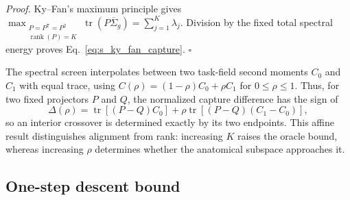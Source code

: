 \noindent\emph{Proof.}
Ky--Fan's maximum principle \citep{horn2013matrix} gives
$\max_{\substack{P=P^{\mathsf T}=P^2\\\operatorname{rank}(P)=K}}\operatorname{tr}(P\overline\Sigma_g)
=\sum_{j=1}^{K}\lambda_j$. Division by the fixed total spectral energy proves
Eq.~\ref{eq:s_ky_fan_capture}. \hfill$\square$

The spectral screen interpolates between two task-field second moments
$C_0$ and $C_1$ with equal trace, using
$C(\rho)=(1-\rho)C_0+\rho C_1$ for $0\leq\rho\leq1$. Thus, for two fixed projectors
$P$ and $Q$, the normalized capture difference has the sign of
\begin{equation}
\Delta(\rho)=\operatorname{tr}[(P-Q)C_0]
+\rho\operatorname{tr}[(P-Q)(C_1-C_0)],
\end{equation}
so an interior crossover is determined exactly by its two endpoints. This
affine result distinguishes alignment from rank: increasing $K$ raises the
oracle bound, whereas increasing $\rho$ determines whether the anatomical
subspace approaches it.

\subsection{One-step descent bound}

